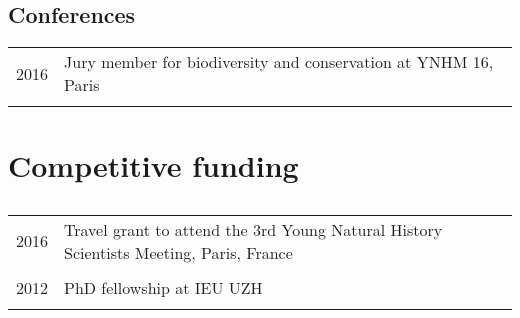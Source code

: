 \documentclass[a4paper,10pt]{article} %
\begin{document}
\subsection*{Conferences}
\begin{tabular}{p{4cm}|p{11cm}}
\hfill \textsc{2016} & Jury member for biodiversity and conservation at YNHM 16, Paris\\
\multicolumn{2}{c}{} \\
\end{tabular}

%
%
%

\section*{Competitive funding}
\subsection*{}
\begin{tabular}{p{4cm}|p{11cm}}
\hfill \textsc{2016} & Travel grant to attend the 3rd Young Natural History Scientists Meeting, Paris, France\\
\multicolumn{2}{c}{} \\
\hfill \textsc{2012} & PhD fellowship at IEU UZH\\
\multicolumn{2}{c}{} \\
\end{tabular}
\end{document}
